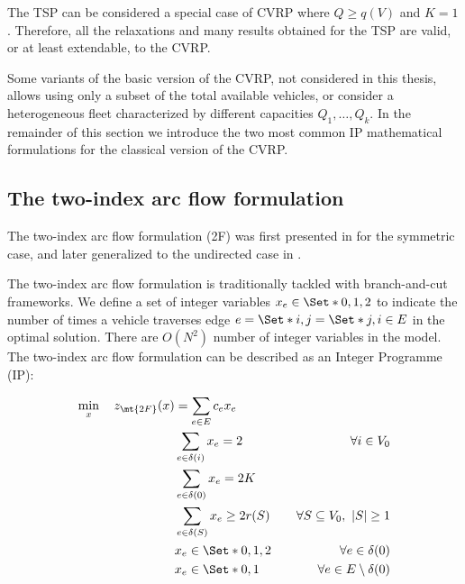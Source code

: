 \medskip

The TSP can be considered a special case of CVRP where $Q \ge q(V)$ and $K = 1$.
Therefore, all the relaxations and many results obtained for the TSP are valid, or at least extendable, to the CVRP.

\medskip

Some variants of the basic version of the CVRP, not considered in this thesis, allows using only a subset of the total available vehicles,
or consider a heterogeneous fleet characterized by different capacities $Q_1, \dots, Q_k$.
In the remainder of this section we introduce the two most common IP mathematical formulations for the classical version of the CVRP.

\subsection{The two-index arc flow formulation}
\label{sec:intro-cvrp-two-index-flow-formulation}

The two-index arc flow formulation (2F) was first presented in \cite{laporte1983, laporte1985} for the symmetric case,
and later generalized to the undirected case in \cite{laporte1986}.

The two-index arc flow formulation is traditionally tackled with branch-and-cut frameworks.
We define a set of integer variables $x_e \in \Set*{0, 1, 2}$ to indicate the number of times
a vehicle traverses edge $e = \Set*{i, j} = \Set*{j, i} \in E$ in the optimal solution.
There are $O(N^2)$ number of integer variables in the model.
The two-index arc flow formulation can be described as an Integer Programme (IP):

\begin{align}
	\min_{x} \quad z_\mt{2F}(x) & = \sum_{e \in E} c_e x_e \label{eq:two-index-flow-obj-func}                                                                                        \\
	                            & \sum_{e \in \delta(i)} x_e = 2                              & \quad \forall i \in V_0 \label{eq:two-index-flow-two-edges-incident-per-customer}    \\
	                            & \sum_{e \in \delta(0)} x_e = 2 K                            & \label{eq:two-index-flow-two-k-edges-incident-in-the-depot-node}                     \\
	                            & \sum_{e \in \delta(S)} x_e \ge 2 r(S)                       & \quad \forall S \subseteq V_0,\ |S| \ge 1 \label{eq:two-index-flow-ccc}              \\
	                            & x_e                   \in \Set*{0, 1, 2}                    & \quad \forall e \in \delta(0) \label{eq:two-index-flow-x-mip-var-bounds-depot}       \\
	                            & x_e                   \in \Set*{0, 1}                       & \quad \forall e \in E \setminus \delta(0) \label{eq:two-index-flow-x-mip-var-bounds}
\end{align}

